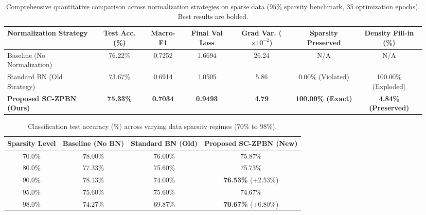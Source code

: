 \begin{table}[t]
\centering
\caption{Comprehensive quantitative comparison across normalization strategies on sparse data ($95\%$ sparsity benchmark, 35 optimization epochs). Best results are bolded.}
\label{tab:main_results}
\begin{tabular}{lcccccc}
\toprule
\textbf{Normalization Strategy} & \textbf{Test Acc. (\%)} & \textbf{Macro-F1} & \textbf{Final Val Loss} & \textbf{Grad Var. ($\times 10^{-2}$)} & \textbf{Sparsity Preserved} & \textbf{Density Fill-in (\%)} \\
\midrule
Baseline (No Normalization)     & 76.22\% & 0.7252 & 1.6694 & 26.24 & N/A & N/A \\
Standard BN (Old Strategy)     & 73.67\% & 0.6914 & 1.0505 & 5.86  & 0.00\% (Violated) & 100.00\% (Exploded) \\
\textbf{Proposed SC-ZPBN (Ours)} & \textbf{75.33\%} & \textbf{0.7034} & \textbf{0.9493} & \textbf{4.79} & \textbf{100.00\% (Exact)} & \textbf{4.84\% (Preserved)} \\
\bottomrule
\end{tabular}
\end{table}

\begin{table}[h]
\centering
\caption{Classification test accuracy (\%) across varying data sparsity regimes ($70\%$ to $98\%$).}
\label{tab:sensitivity_results}
\begin{tabular}{cccc}
\toprule
\textbf{Sparsity Level} & \textbf{Baseline (No BN)} & \textbf{Standard BN (Old)} & \textbf{Proposed SC-ZPBN (New)} \\
\midrule
70.0\% & 78.00\% & 76.00\% & 75.87\% \\
80.0\% & 77.33\% & 75.60\% & 75.73\% \\
90.0\% & 78.13\% & 74.00\% & \textbf{76.53\%} (+2.53\%) \\
95.0\% & 75.60\% & 75.60\% & 74.67\% \\
98.0\% & 74.27\% & 69.87\% & \textbf{70.67\%} (+0.80\%) \\
\bottomrule
\end{tabular}
\end{table}
